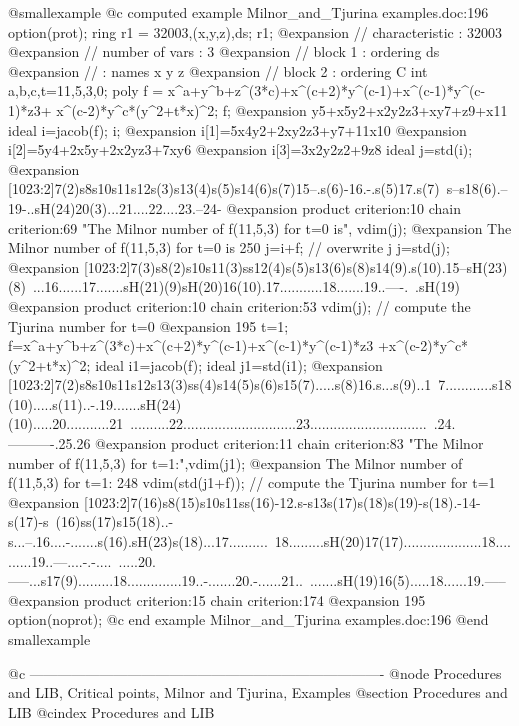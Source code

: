 @smallexample
@c computed example Milnor_and_Tjurina examples.doc:196 
  option(prot);
  ring r1 = 32003,(x,y,z),ds;
  r1;
@expansion{} //   characteristic : 32003
@expansion{} //   number of vars : 3
@expansion{} //        block   1 : ordering ds
@expansion{} //                  : names    x y z 
@expansion{} //        block   2 : ordering C
  int a,b,c,t=11,5,3,0;
  poly f = x^a+y^b+z^(3*c)+x^(c+2)*y^(c-1)+x^(c-1)*y^(c-1)*z3+
           x^(c-2)*y^c*(y^2+t*x)^2;
  f;
@expansion{} y5+x5y2+x2y2z3+xy7+z9+x11
  ideal i=jacob(f);
  i;
@expansion{} i[1]=5x4y2+2xy2z3+y7+11x10
@expansion{} i[2]=5y4+2x5y+2x2yz3+7xy6
@expansion{} i[3]=3x2y2z2+9z8
  ideal j=std(i);
@expansion{} [1023:2]7(2)s8s10s11s12s(3)s13(4)s(5)s14(6)s(7)15--.s(6)-16.-.s(5)17.s(7)\
   s--s18(6).--19-..sH(24)20(3)...21....22....23.--24-
@expansion{} product criterion:10 chain criterion:69
  "The Milnor number of f(11,5,3) for t=0 is", vdim(j);
@expansion{} The Milnor number of f(11,5,3) for t=0 is 250
  j=i+f;    // overwrite j
  j=std(j);
@expansion{} [1023:2]7(3)s8(2)s10s11(3)ss12(4)s(5)s13(6)s(8)s14(9).s(10).15--sH(23)(8)\
   ...16......17.......sH(21)(9)sH(20)16(10).17...........18.......19..----.\
   .sH(19)
@expansion{} product criterion:10 chain criterion:53
  vdim(j);  // compute the Tjurina number for t=0
@expansion{} 195
  t=1;
  f=x^a+y^b+z^(3*c)+x^(c+2)*y^(c-1)+x^(c-1)*y^(c-1)*z3
    +x^(c-2)*y^c*(y^2+t*x)^2;
  ideal i1=jacob(f);
  ideal j1=std(i1);
@expansion{} [1023:2]7(2)s8s10s11s12s13(3)ss(4)s14(5)s(6)s15(7).....s(8)16.s...s(9)..1\
   7............s18(10).....s(11)..-.19.......sH(24)(10).....20...........21\
   ..........22.............................23..............................\
   .24.----------.25.26
@expansion{} product criterion:11 chain criterion:83
  "The Milnor number of f(11,5,3) for t=1:",vdim(j1);
@expansion{} The Milnor number of f(11,5,3) for t=1: 248
  vdim(std(j1+f));   // compute the Tjurina number for t=1
@expansion{} [1023:2]7(16)s8(15)s10s11ss(16)-12.s-s13s(17)s(18)s(19)-s(18).-14-s(17)-s\
   (16)ss(17)s15(18)..-s...--.16....-.......s(16).sH(23)s(18)...17..........\
   18.........sH(20)17(17)....................18..........19..---....-.-....\
   .....20.-----...s17(9).........18..............19..-.......20.-......21..\
   .......sH(19)16(5).....18......19.-----
@expansion{} product criterion:15 chain criterion:174
@expansion{} 195
  option(noprot);
@c end example Milnor_and_Tjurina examples.doc:196
@end smallexample

@c ----------------------------------------------------------------------------
@node Procedures and LIB, Critical points, Milnor and Tjurina, Examples
@section Procedures and LIB
@cindex Procedures and LIB

